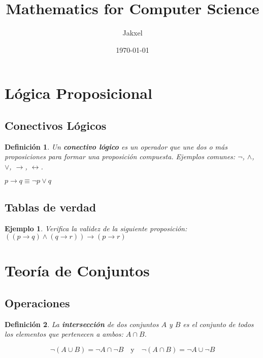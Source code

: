 \documentclass[11pt]{article}
\title{Mathematics for Computer Science}
\author{Jakxel}
\date{\today}
\newtheorem{definition}{Definición}[section]
\newtheorem{example}{Ejemplo}[section]
\begin{document}
\maketitle
\tableofcontents
\newpage

\section{Lógica Proposicional}
\subsection{Conectivos Lógicos}
\begin{definition}
Un \textbf{conectivo lógico} es un operador que une dos o más proposiciones para formar una proposición compuesta. Ejemplos comunes: $\neg$, $\land$, $\lor$, $\rightarrow$, $\leftrightarrow$.
\end{definition}

\begin{keyformula}
$p \rightarrow q \equiv \neg p \lor q$
\end{keyformula}

\subsection{Tablas de verdad}
\begin{example}
Verifica la validez de la siguiente proposición: $((p \rightarrow q) \land (q \rightarrow r)) \rightarrow (p \rightarrow r)$
\end{example}

\section{Teoría de Conjuntos}
\subsection{Operaciones}
\begin{definition}
La \textbf{intersección} de dos conjuntos $A$ y $B$ es el conjunto de todos los elementos que pertenecen a ambos: $A \cap B$.
\end{definition}

\begin{keyformula}
\[
\neg (A \cup B) = \neg A \cap \neg B \quad \text{y} \quad \neg (A \cap B) = \neg A \cup \neg B
\]
\end{keyformula}
\end{document}
